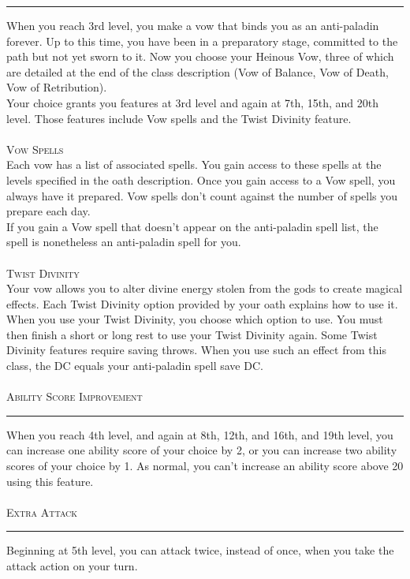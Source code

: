 \documentclass[22pt,a4paper]{article}
\newcommand{\HRule}[2]{\par
  \vspace*{\dimexpr-\parskip-\baselineskip+#2}
  \begingroup
  	\color{sepcol}
  	\noindent\rule{\linewidth}{#1}\par
  \endgroup  
  \vspace*{\dimexpr-\parskip-.5\baselineskip+#2}}
\begin{document}
\begin{multicols*}{2}
\HRule{1pt}{8pt}
When you reach 3rd level, you make a vow that binds you as an anti-paladin forever. Up to this time, you have been in a preparatory stage, committed to the path but not yet sworn to it. Now you choose your Heinous Vow, three of which are detailed at the end of the class description (Vow of Balance, Vow of Death, Vow of Retribution).\\
\indent Your choice grants you features at 3rd level and again at 7th, 15th, and 20th level. Those features include Vow spells and the Twist Divinity feature.\\
\\
{\fontsize{12pt}{12pt}\textcolor{title}{\textsc{Vow Spells}}}\\
Each vow has a list of associated spells. You gain access to these spells at the levels specified in the oath description. Once you gain access to a Vow spell, you always have it prepared. Vow spells don’t count against the number of spells you prepare each day.\\
\indent If you gain a Vow spell that doesn’t appear on the anti-paladin spell list, the spell is nonetheless an anti-paladin spell for you.\\
\\
{\fontsize{12pt}{12pt}\textcolor{title}{\textsc{Twist Divinity}}}\\
Your vow allows you to alter divine energy stolen from the gods to create magical effects. Each Twist Divinity option provided by your oath explains how to use it.\\
\indent When you use your Twist Divinity, you choose which option to use. You must then finish a short or long rest to use your Twist Divinity again. 
Some Twist Divinity features require saving throws. When you use such an effect from this class, the DC equals your anti-paladin spell save DC.\\
\\
{\fontsize{14pt}{14pt}\textcolor{title}{\textsc{Ability Score Improvement}}}
\HRule{1pt}{8pt}
When you reach 4th level, and again at 8th, 12th, and 16th, and 19th level, you can increase one ability score of your choice by 2, or you can increase two ability scores of your choice by 1. As normal, you can’t increase an ability score above 20 using this feature.\\
\\
{\fontsize{14pt}{14pt}\textcolor{title}{\textsc{Extra Attack}}}
\HRule{1pt}{8pt}
Beginning at 5th level, you can attack twice, instead of once, when you take the attack action on your turn.\\

\end{multicols*}
\end{document}
